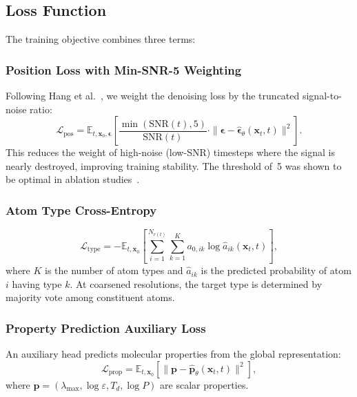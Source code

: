 \documentclass[12pt,a4paper]{article}
\providecommand{\E}{}
\renewcommand{\E}{\mathbb{E}}
\newcommand{\SNR}{\mathrm{SNR}}
\newcommand{\bx}{\bm{x}}
\newcommand{\bep}{\bm{\epsilon}}
\newcommand{\cL}{\mathcal{L}}
\begin{document}
\subsection{Loss Function}\label{sec:loss}

The training objective combines three terms:

\subsubsection{Position Loss with Min-SNR-5 Weighting}

Following Hang et al.~\cite{hang2023minsnr}, we weight the denoising loss by the truncated signal-to-noise ratio:
\begin{equation}\label{eq:loss_pos}
    \cL_{\text{pos}} = \E_{t, \bx_0, \bep}\left[\frac{\min(\SNR(t), 5)}{\SNR(t)} \cdot \|\bep - \hat{\bep}_\theta(\bx_t, t)\|^2\right].
\end{equation}
This reduces the weight of high-noise (low-SNR) timesteps where the signal is nearly destroyed, improving training stability. The threshold of~5 was shown to be optimal in ablation studies~\cite{hang2023minsnr}.

\subsubsection{Atom Type Cross-Entropy}

\begin{equation}\label{eq:loss_type}
    \cL_{\text{type}} = -\E_{t, \bx_0}\left[\sum_{i=1}^{N_{r(t)}} \sum_{k=1}^{K} a_{0,ik} \log \hat{a}_{ik}(\bx_t, t)\right],
\end{equation}
where $K$ is the number of atom types and $\hat{a}_{ik}$ is the predicted probability of atom $i$ having type $k$. At coarsened resolutions, the target type is determined by majority vote among constituent atoms.

\subsubsection{Property Prediction Auxiliary Loss}

An auxiliary head predicts molecular properties from the global representation:
\begin{equation}\label{eq:loss_prop}
    \cL_{\text{prop}} = \E_{t, \bx_0}\left[\|\bm{p} - \hat{\bm{p}}_\theta(\bx_t, t)\|^2\right],
\end{equation}
where $\bm{p} = (\lambda_{\max}, \log \varepsilon, T_d, \log P)$ are scalar properties.
\end{document}
